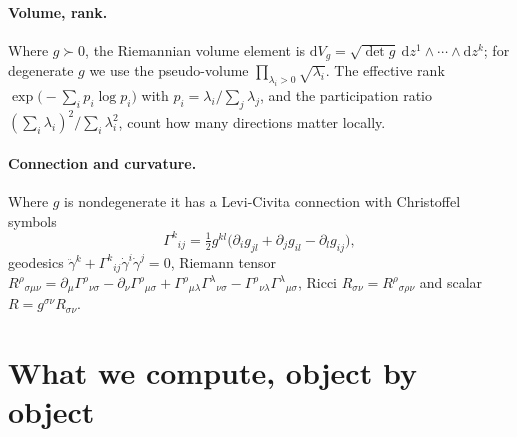 \documentclass[11pt]{article}
\newcommand{\dd}{\mathrm{d}}
\begin{document}
\paragraph{Volume, rank.}
Where $g\succ0$, the Riemannian volume element is $\dd V_{g}=\sqrt{\det g}\ \dd z^{1}\!\wedge\!\cdots\!\wedge\dd z^{k}$;
for degenerate $g$ we use the pseudo-volume $\prod_{\lambda_{i}>0}\sqrt{\lambda_{i}}$. The
effective rank $\exp\!\big(-\sum_i p_i\log p_i\big)$ with $p_i=\lambda_i/\sum_j\lambda_j$, and
the participation ratio $(\sum_i\lambda_i)^2/\sum_i\lambda_i^2$, count how many directions
matter locally.

\paragraph{Connection and curvature.}
Where $g$ is nondegenerate it has a Levi-Civita connection with Christoffel symbols
\[
  \Gamma^{k}{}_{ij}=\tfrac12 g^{kl}\big(\partial_{i}g_{jl}+\partial_{j}g_{il}-\partial_{l}g_{ij}\big),
\]
geodesics $\ddot\gamma^{k}+\Gamma^{k}{}_{ij}\dot\gamma^{i}\dot\gamma^{j}=0$, Riemann tensor
$R^{\rho}{}_{\sigma\mu\nu}=\partial_{\mu}\Gamma^{\rho}{}_{\nu\sigma}-\partial_{\nu}\Gamma^{\rho}{}_{\mu\sigma}
+\Gamma^{\rho}{}_{\mu\lambda}\Gamma^{\lambda}{}_{\nu\sigma}-\Gamma^{\rho}{}_{\nu\lambda}\Gamma^{\lambda}{}_{\mu\sigma}$,
Ricci $R_{\sigma\nu}=R^{\rho}{}_{\sigma\rho\nu}$ and scalar $R=g^{\sigma\nu}R_{\sigma\nu}$.

\section{What we compute, object by object}\label{sec:compute}
\end{document}
